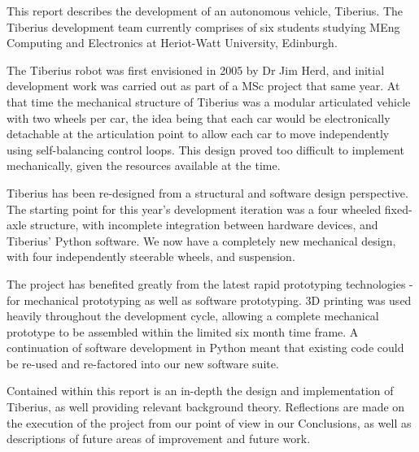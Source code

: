 This report describes the development of an autonomous vehicle, Tiberius. The Tiberius development team currently comprises of six students studying MEng Computing and Electronics at Heriot-Watt University, Edinburgh.
\newline

The Tiberius robot was first envisioned in 2005 by Dr Jim Herd, and initial development work was carried out as part of a MSc project that same year. At that time the mechanical structure of Tiberius was a modular articulated vehicle with two wheels per car, the idea being that each car would be electronically detachable at the articulation point to allow each car to move independently using self-balancing control loops. This design proved too difficult to implement mechanically, given the resources available at the time.
\newline

Tiberius has been re-designed from a structural and software design perspective. The starting point for this year's development iteration was a four wheeled fixed-axle structure, with incomplete integration between hardware devices, and Tiberius' Python software. We now have a completely new mechanical design, with four independently steerable wheels, and suspension.
\newline

The project has benefited greatly from the latest rapid prototyping technologies - for mechanical prototyping as well as software prototyping. 3D printing was used heavily throughout the development cycle, allowing a complete mechanical prototype to be assembled within the limited six month time frame. A continuation of software development in Python meant that existing code could be re-used and re-factored into our new software suite.
\newline

Contained within this report is an in-depth the design and implementation of Tiberius, as well providing relevant background theory. Reflections are made on the execution of the project from our point of view in our Conclusions, as well as descriptions of future areas of improvement and future work.

\pagebreak

